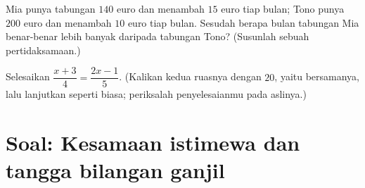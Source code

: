\begin{exercise}[$\star\star$]\label{exo:g8:equations:11}
Mia punya tabungan $140$ euro dan menambah $15$ euro tiap bulan; Tono
punya $200$ euro dan menambah $10$ euro tiap bulan. Sesudah berapa
bulan tabungan Mia benar-benar lebih banyak daripada tabungan Tono?
(Susunlah sebuah pertidaksamaan.)
\end{exercise}

\begin{exercise}[$\star\star\star$]\label{exo:g8:equations:12}
Selesaikan  $\dfrac{x + 3}{4} = \dfrac{2x - 1}{5}$.
(Kalikan kedua ruasnya dengan $20$, yaitu  bersamanya, lalu
lanjutkan seperti biasa; periksalah penyelesaianmu pada 
aslinya.)
\end{exercise}

\section{Soal: Kesamaan istimewa dan tangga bilangan ganjil}

